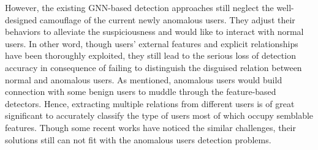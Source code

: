 \documentclass[conference]{IEEEtran}
\theoremstyle{definition}
\begin{document}
However, the existing GNN-based detection approaches still neglect the well-designed camouflage of the current newly anomalous users. They adjust their behaviors to alleviate the suspiciousness and would like to interact with normal users\cite{dou2020enhancing}. 
In other word, though users' external features and explicit relationships have been thoroughly exploited\cite{li2020modeling}, they still lead to the serious loss of detection accuracy in consequence of failing to distinguish the disguised relation between normal and anomalous users. As mentioned, anomalous users would build connection with some benign users to muddle through the feature-based detectors. Hence, extracting multiple relations from different users is of great significant to accurately classify the type of users most of which occupy semblable features\cite{zhao2021automatically, zhao2020multi}. Though some recent works have noticed the similar challenges, their solutions still can not fit with the anomalous users detection problems.
\end{document}
